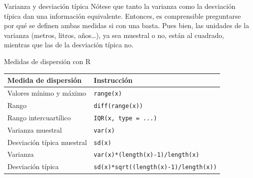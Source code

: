 \documentclass[
  ignorenonframetext,
  aspectratio=169]{beamer}
\begin{document}
\begin{frame}{Varianza y desviación típica}
\protect\hypertarget{varianza-y-desviaciuxf3n-tuxedpica}{}
Nótese que tanto la varianza como la desviación típica dan una
información equivalente. Entonces, es comprensible preguntarse por qué
se definen ambas medidas si con una basta. Pues bien, las unidades de la
varianza (metros, litros, años\ldots), ya sea muestral o no, están al
cuadrado, mientras que las de la desviación típica no.
\end{frame}

\begin{frame}[fragile]{Medidas de dispersión con R}
\protect\hypertarget{medidas-de-dispersiuxf3n-con-r}{}
\begin{longtable}[]{@{}ll@{}}
\toprule()
Medida de dispersión & Instrucción \\
\midrule()
\endhead
Valores mínimo y máximo & \texttt{range(x)} \\
Rango & \texttt{diff(range(x))} \\
Rango intercuartílico & \texttt{IQR(x,\ type\ =\ ...)} \\
Varianza muestral & \texttt{var(x)} \\
Desviación típica muestral & \texttt{sd(x)} \\
Varianza & \texttt{var(x)*(length(x)-1)/length(x)} \\
Desviación típica & \texttt{sd(x)*sqrt((length(x)-1)/length(x))} \\
\bottomrule()
\end{longtable}
\end{frame}
\end{document}
